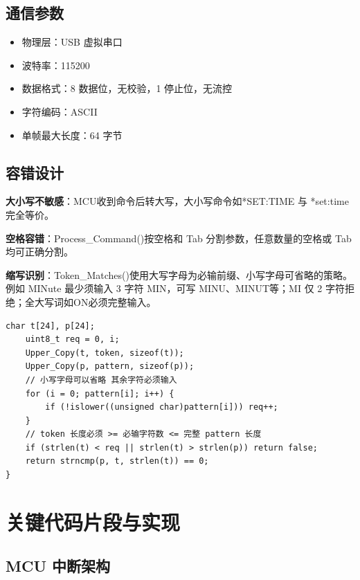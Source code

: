 \documentclass[11pt,a4paper]{article}
\begin{document}
\subsection{通信参数}

\begin{itemize}
  \item 物理层：USB 虚拟串口
  \item 波特率：115200
  \item 数据格式：8 数据位，无校验，1 停止位，无流控
  \item 字符编码：ASCII
  \item 单帧最大长度：64 字节
\end{itemize}

\subsection{容错设计}

\textbf{大小写不敏感}：MCU收到命令后转大写，大小写命令如*SET:TIME 与 *set:time 完全等价。

\textbf{空格容错}：Process\_Command()按空格和 Tab 分割参数，任意数量的空格或 Tab 均可正确分割。

\textbf{缩写识别}：Token\_Matches()使用大写字母为必输前缀、小写字母可省略的策略。例如 MINute 最少须输入 3 字符 MIN，可写 MINU、MINUT等；MI 仅 2 字符拒绝；全大写词如ON必须完整输入。
\begin{lstlisting}[style=cstyle]
    char t[24], p[24];
    uint8_t req = 0, i;
    Upper_Copy(t, token, sizeof(t));
    Upper_Copy(p, pattern, sizeof(p));
    // 小写字母可以省略 其余字符必须输入
    for (i = 0; pattern[i]; i++) {
        if (!islower((unsigned char)pattern[i])) req++;
    }
    // token 长度必须 >= 必输字符数 <= 完整 pattern 长度
    if (strlen(t) < req || strlen(t) > strlen(p)) return false;
    return strncmp(p, t, strlen(t)) == 0;
}
\end{lstlisting}

\section{关键代码片段与实现}

\subsection{MCU 中断架构}
\end{document}

